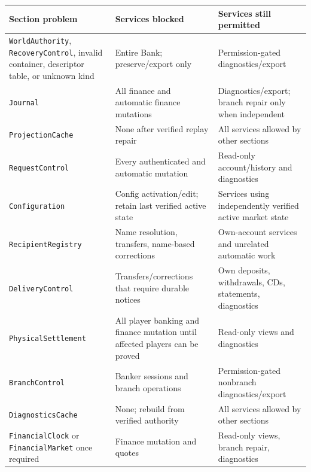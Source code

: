 \documentclass[
  10pt,
  letterpaper,
]{article}
\newcommand{\passthrough}[1]{#1}
\newcounter{none} %
\begin{document}
{\def\LTcaptype{none} %
\begin{longtable}[]{@{}
  >{\raggedright\arraybackslash}p{}
  >{\raggedright\arraybackslash}p{}
  >{\raggedright\arraybackslash}p{}@{}}
\toprule\noalign{}
\begin{minipage}[b]{\linewidth}\raggedright
Section problem
\end{minipage} & \begin{minipage}[b]{\linewidth}\raggedright
Services blocked
\end{minipage} & \begin{minipage}[b]{\linewidth}\raggedright
Services still permitted
\end{minipage} \\
\midrule\noalign{}
\endhead
\bottomrule\noalign{}
\endlastfoot
\passthrough{\lstinline!WorldAuthority!},
\passthrough{\lstinline!RecoveryControl!}, invalid container, descriptor
table, or unknown kind & Entire Bank; preserve/export only &
Permission-gated diagnostics/export \\
\passthrough{\lstinline!Journal!} & All finance and automatic finance
mutations & Diagnostics/export; branch repair only when independent \\
\passthrough{\lstinline!ProjectionCache!} & None after verified replay
repair & All services allowed by other sections \\
\passthrough{\lstinline!RequestControl!} & Every authenticated and
automatic mutation & Read-only account/history and diagnostics \\
\passthrough{\lstinline!Configuration!} & Config activation/edit; retain
last verified active state & Services using independently verified
active market state \\
\passthrough{\lstinline!RecipientRegistry!} & Name resolution,
transfers, name-based corrections & Own-account services and unrelated
automatic work \\
\passthrough{\lstinline!DeliveryControl!} & Transfers/corrections that
require durable notices & Own deposits, withdrawals, CDs, statements,
diagnostics \\
\passthrough{\lstinline!PhysicalSettlement!} & All player banking and
finance mutation until affected players can be proved & Read-only views
and diagnostics \\
\passthrough{\lstinline!BranchControl!} & Banker sessions and branch
operations & Permission-gated nonbranch diagnostics/export \\
\passthrough{\lstinline!DiagnosticsCache!} & None; rebuild from verified
authority & All services allowed by other sections \\
\passthrough{\lstinline!FinancialClock!} or
\passthrough{\lstinline!FinancialMarket!} once required & Finance
mutation and quotes & Read-only views, branch repair, diagnostics \\
\end{longtable}
}
\end{document}
